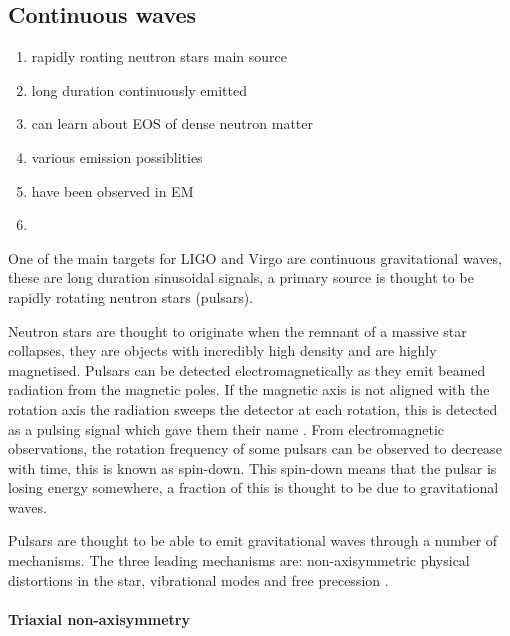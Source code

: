 \subsection{Continuous waves}

\begin{enumerate}
    \item rapidly roating neutron stars main source
    \item long duration continuously emitted
    \item can learn about EOS of dense neutron matter
    \item various emission possiblities
    \item have been observed in EM
    \item 
\end{enumerate}

One of the main targets for \ac{LIGO} and Virgo are continuous gravitational waves, these are long duration sinusoidal signals, a primary source is thought to be rapidly rotating neutron stars (pulsars). 

Neutron stars are thought to originate when the remnant of a massive star collapses, they are objects with incredibly high density and are highly magnetised.
Pulsars can be detected electromagnetically as they emit beamed radiation from the magnetic poles.
If the magnetic axis is not aligned with the rotation axis the radiation sweeps the detector at each rotation, this is detected as a pulsing signal which gave them their name \cite{lyne_graham-smith_2012}.
From electromagnetic observations, the rotation frequency of some pulsars can be observed to decrease with time, this is known as spin-down.
This spin-down means that the pulsar is losing energy somewhere, a fraction of this is thought to be due to gravitational waves. 

Pulsars are thought to be able to emit gravitational waves through a number of mechanisms. The three leading mechanisms are: non-axisymmetric physical distortions in the star, vibrational modes and free precession \cite{Becker2009}.

\paragraph{Triaxial non-axisymmetry}

